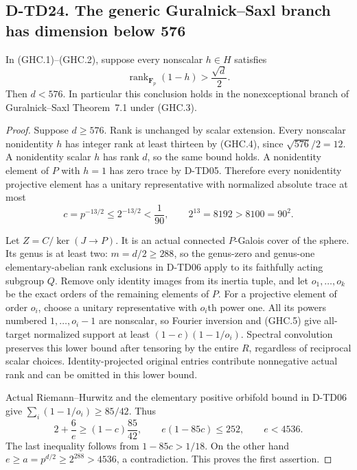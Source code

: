 \subsection*{D-TD24. The generic Guralnick--Saxl branch has dimension below 576}

\begin{proposition}[D-TD24]
In (GHC.1)--(GHC.2), suppose every nonscalar $h\in H$ satisfies
\[
                  \operatorname{rank}_{\mathbf F_p}(1-h)
                                      >\frac{\sqrt d}{2}.
 \tag{GHC.4}
\]
Then $d<576$.  In particular this conclusion holds in the
nonexceptional branch of Guralnick--Saxl Theorem~7.1 under (GHC.3).
\end{proposition}

\begin{proof}
Suppose $d\ge576$.  Rank is unchanged by scalar extension.
Every nonscalar nonidentity $h$ has integer rank at least thirteen
by (GHC.4), since $\sqrt{576}/2=12$.  A nonidentity scalar $h$
has rank $d$, so the same bound holds.  A nonidentity element of
$P$ with $h=1$ has zero trace by D-TD05.  Therefore every
nonidentity projective element has a unitary representative with
normalized absolute trace at most
\[
                 c=p^{-13/2}\le2^{-13/2}<\frac1{90},
                 \qquad 2^{13}=8192>8100=90^2.
 \tag{GHC.5}
\]

Let $Z=C/\ker(J\to P)$.  It is an actual connected $P$-Galois
cover of the sphere.  Its genus is at least two: $m=d/2\ge288$,
so the genus-zero and genus-one elementary-abelian rank exclusions
in D-TD06 apply to its faithfully acting subgroup $Q$.
Remove only identity images from its inertia tuple, and let
$o_1,\ldots,o_k$ be the exact orders of the remaining elements
of $P$.  For a projective element of order $o_i$, choose a unitary
representative with $o_i$th power one.  All its powers numbered
$1,\ldots,o_i-1$ are nonscalar, so Fourier inversion and (GHC.5)
give all-target normalized support at least
$(1-c)(1-1/o_i)$.  Spectral convolution preserves this lower
bound after tensoring by the entire $R$, regardless of reciprocal
scalar choices.  Identity-projected original entries contribute
nonnegative actual rank and can be omitted in this lower bound.

Actual Riemann--Hurwitz and the elementary positive orbifold
bound in D-TD06 give $\sum_i(1-1/o_i)\ge85/42$.  Thus
\[
       2+\frac6e\ge(1-c)\frac{85}{42},\qquad
       e(1-85c)\le252,\qquad e<4536.
 \tag{GHC.6}
\]
The last inequality follows from $1-85c>1/18$.  On the other
hand $e\ge a=p^{d/2}\ge2^{288}>4536$, a contradiction.
This proves the first assertion.


\end{proof}
